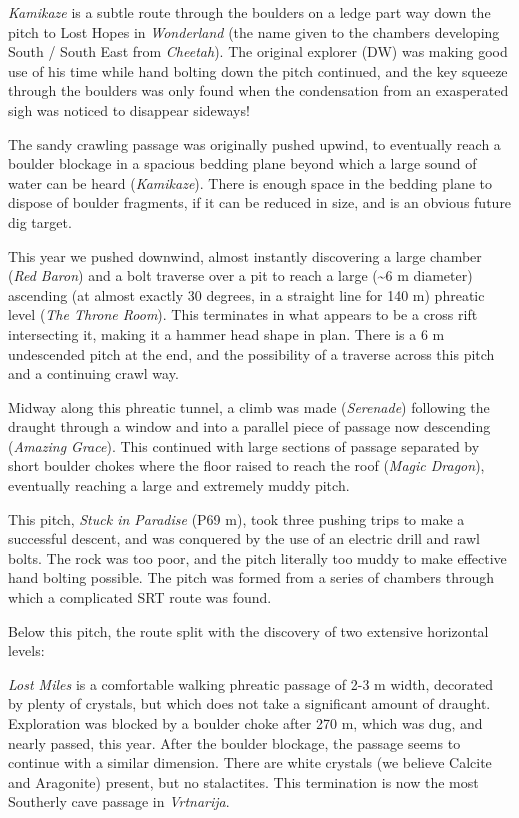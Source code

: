 \emph{Kamikaze} is a subtle route through the boulders on a ledge part
way down the pitch to Lost Hopes in \emph{Wonderland} (the name given to
the chambers developing South / South East from \emph{Cheetah}). The
original explorer (DW) was making good use of his time while hand
bolting down the pitch continued, and the key squeeze through the
boulders was only found when the condensation from an exasperated sigh
was noticed to disappear sideways!

The sandy crawling passage was originally pushed upwind, to eventually
reach a boulder blockage in a spacious bedding plane beyond which a
large sound of water can be heard (\emph{Kamikaze}). There is enough
space in the bedding plane to dispose of boulder fragments, if it can be
reduced in size, and is an obvious future dig target.

This year we pushed downwind, almost instantly discovering a large
chamber (\emph{Red Baron}) and a bolt traverse over a pit to reach a
large (\textasciitilde 6 m diameter) ascending (at almost exactly 30
degrees, in a straight line for 140 m) phreatic level (\emph{The Throne
Room}). This terminates in what appears to be a cross rift intersecting
it, making it a hammer head shape in plan. There is a 6 m undescended
pitch at the end, and the possibility of a traverse across this pitch
and a continuing crawl way.

Midway along this phreatic tunnel, a climb was made (\emph{Serenade})
following the draught through a window and into a parallel piece of
passage now descending (\emph{Amazing Grace}). This continued with large
sections of passage separated by short boulder chokes where the floor
raised to reach the roof (\emph{Magic Dragon}), eventually reaching a
large and extremely muddy pitch.

This pitch, \emph{Stuck in Paradise} (P69 m), took three pushing trips
to make a successful descent, and was conquered by the use of an
electric drill and rawl bolts. The rock was too poor, and the pitch
literally too muddy to make effective hand bolting possible. The pitch
was formed from a series of chambers through which a complicated SRT
route was found.

Below this pitch, the route split with the discovery of two extensive
horizontal levels:

\emph{Lost Miles}  is a comfortable
walking phreatic passage of 2-3 m width, decorated by plenty of
crystals, but which does not take a significant amount of draught.
Exploration was blocked by a boulder choke after 270 m, which was dug,
and nearly passed, this year. After the boulder blockage, the passage
seems to continue with a similar dimension. There are white crystals (we
believe Calcite and Aragonite) present, but no stalactites. This
termination is now the most Southerly cave passage in \emph{Vrtnarija}.

